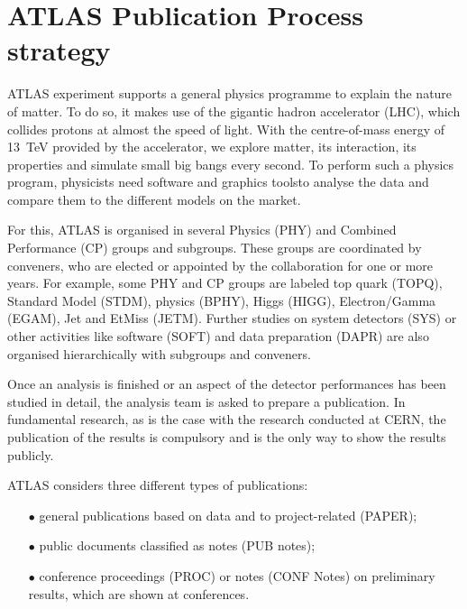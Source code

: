 
\section{ATLAS Publication Process strategy}%
\label{sec:ATLAS_work_strategy}


ATLAS experiment supports a  general physics programme to explain the nature of matter. To do so,  it makes use of the gigantic hadron accelerator (LHC), which collides protons at almost the speed of light. With the centre-of-mass energy of \SI{13}{\TeV} provided by the accelerator, we explore matter, its interaction, its properties and simulate small big bangs every second. To perform such a physics program, physicists need software and graphics toolsto analyse the data and compare them to the different models on the market.

For this, ATLAS is organised in several Physics (PHY) and  Combined Performance (CP) groups and subgroups. These groups are coordinated by conveners, who are elected or appointed by the collaboration for one or more years.
For example, some  PHY and CP groups are labeled top quark (TOPQ), Standard Model (STDM), \PB physics (BPHY), Higgs (HIGG), Electron/Gamma (EGAM), Jet and EtMiss (JETM).
Further studies on system detectors (SYS) or other activities like software (SOFT) and data preparation (DAPR) are also organised hierarchically with subgroups and conveners.

Once an analysis is finished or an aspect of the detector performances has been studied in detail,
the analysis team is asked to prepare a publication.
In fundamental research, as is the case with the research conducted at CERN, the publication of the results is  compulsory and is the only way to show the results publicly.

ATLAS considers three different types of publications:
\begin{itemize}
    \item[$\bullet$] general publications based on data and to project-related  (PAPER);
    \item[$\bullet$] public documents classified as notes (PUB notes);
    \item[$\bullet$] conference proceedings (PROC) or notes (CONF Notes) on preliminary results, which are shown at conferences.
\end{itemize}

